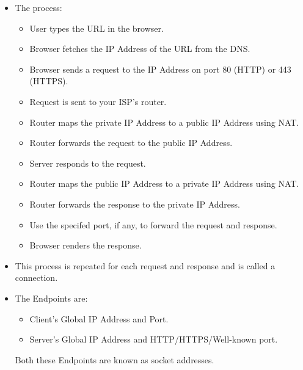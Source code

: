 \documentclass[a4paper, twoside]{report}
\begin{document}
\begin{itemize}
    \item The process:
    \begin{itemize}
        \item User types the URL in the browser.
        \item Browser fetches the IP Address of the URL from the DNS\@.
        \item Browser sends a request to the IP Address on port 80 (HTTP) or 443 (HTTPS).
        \item Request is sent to your ISP's router.
        \item Router maps the private IP Address to a public IP Address using NAT\@.
        \item Router forwards the request to the public IP Address.
        \item Server responds to the request.
        \item Router maps the public IP Address to a private IP Address using NAT\@.
        \item Router forwards the response to the private IP Address.
        \item Use the specifed port, if any, to forward the request and response.
        \item Browser renders the response.
    \end{itemize}
    \item This process is repeated for each request and response and is called a connection.
    \item The Endpoints are:
    \begin{itemize}
        \item Client's Global IP Address and Port.
        \item Server's Global IP Address and HTTP/HTTPS/Well-known port.
    \end{itemize}
    Both these Endpoints are known as socket addresses.
\end{itemize}
\end{document}
